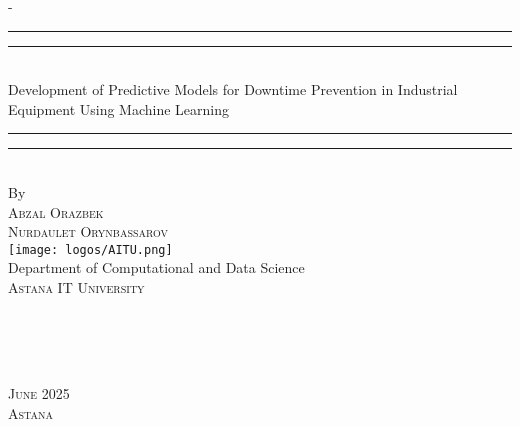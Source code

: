 \begin{titlingpage}
\begin{SingleSpace}
\calccentering{\unitlength} 
\begin{adjustwidth*}{\unitlength}{-\unitlength}
\vspace*{5mm}
\begin{center}
\rule[0.5ex]{\linewidth}{2pt}\vspace*{-\baselineskip}\vspace*{3.2pt}
\rule[0.5ex]{\linewidth}{1pt}\\[\baselineskip]
{
\linespread{2.0} \selectfont
%
{\HUGE Development of Predictive Models for Downtime Prevention in Industrial Equipment Using Machine Learning }\\[4mm]
}

%
\rule[0.5ex]{\linewidth}{1pt}\vspace*{-\baselineskip}\vspace{3.2pt}
\rule[0.5ex]{\linewidth}{2pt}\\
\vspace{6.5mm}
{\large By}\\
\vspace{6.5mm}
{\large\textsc{Abzal Orazbek}}\\
\vspace{3mm}
{\large\textsc{Nurdaulet Orynbassarov}}\\
\vspace{11mm}
\texttt{[image: logos/AITU.png]}\\
\vspace{6mm}
{\large Department of Computational and Data Science\\
\textsc{Astana IT University}}\\
\vspace{20mm}
\begin{minipage}{10cm}
 \\
 \\
\end{minipage}\\
\vspace{25mm}
{\large\textsc{June 2025}}\\
{\large\textsc{Astana}}
\vspace{1mm}
\end{center}
\end{adjustwidth*}
\end{SingleSpace}
\end{titlingpage}